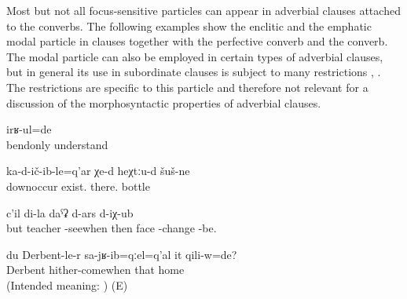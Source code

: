 Most but not all focus-sensitive particles can appear in adverbial clauses attached to the converbs. The following examples show the enclitic   and the emphatic modal particle  in clauses together with the perfective converb and the  converb. The modal particle  can also be employed in certain types of adverbial clauses, but in general its use in subordinate clauses is subject to many restrictions , . The restrictions are specific to this particle and therefore not relevant for a discussion of the morphosyntactic properties of adverbial clauses.
%
\begin{exe}
	\ex	\label{ex:‎‎‎I understood (everything) only wrongly)}
	\gll	[b-alk'-un-ne=cun]	irʁ-ul=de\\
		bendonly	understand\\
	\glt	{}

	\ex	\label{ex:Fallen down there are bottles there}
	\gll	ka-d-ič-ib-le=q'ar	χe-d	heχtːu-d	šuš-ne\\
		downoccur	exist.	there.	bottle\\
	\glt	{}

	
		\ex	\label{But when I saw the teacher, my face changed (i.e. turned red)}
		\gll	[a	učitil	či-w-až-ib=qːel=q'al]	c'il	di-la	daˁʡ d-ars	d-iχ-ub\\
			but	teacher	-seewhen	then		face \tsc{npl}-change 	-be.	\\
		\glt	{} 
	
		\ex	\label{ex:‎‎‎Was he at home when I came back from Derbent@B}
		\gll	{*} 	du		Derbent-le-r	sa-jʁ-ib=qːel=q'al	it	qili-w=de?\\
			{}		Derbent	hither-comewhen	that	home	\\
		\glt	(Intended meaning: ) (E)

\end{exe}

